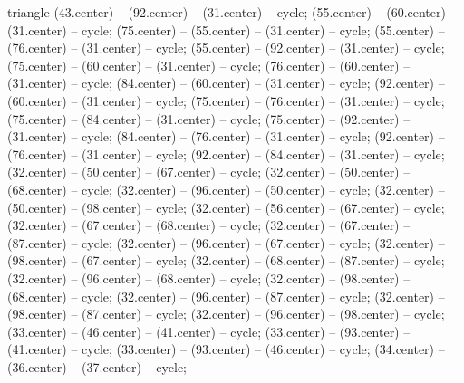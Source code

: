 \begin{pgfonlayer}{triangle}
 (43.center) -- (92.center) -- (31.center) -- cycle; 
 (55.center) -- (60.center) -- (31.center) -- cycle; 
 (75.center) -- (55.center) -- (31.center) -- cycle; 
 (55.center) -- (76.center) -- (31.center) -- cycle; 
 (55.center) -- (92.center) -- (31.center) -- cycle; 
 (75.center) -- (60.center) -- (31.center) -- cycle; 
 (76.center) -- (60.center) -- (31.center) -- cycle; 
 (84.center) -- (60.center) -- (31.center) -- cycle; 
 (92.center) -- (60.center) -- (31.center) -- cycle; 
 (75.center) -- (76.center) -- (31.center) -- cycle; 
 (75.center) -- (84.center) -- (31.center) -- cycle; 
 (75.center) -- (92.center) -- (31.center) -- cycle; 
 (84.center) -- (76.center) -- (31.center) -- cycle; 
 (92.center) -- (76.center) -- (31.center) -- cycle; 
 (92.center) -- (84.center) -- (31.center) -- cycle; 
 (32.center) -- (50.center) -- (67.center) -- cycle; 
 (32.center) -- (50.center) -- (68.center) -- cycle; 
 (32.center) -- (96.center) -- (50.center) -- cycle; 
 (32.center) -- (50.center) -- (98.center) -- cycle; 
 (32.center) -- (56.center) -- (67.center) -- cycle; 
 (32.center) -- (67.center) -- (68.center) -- cycle; 
 (32.center) -- (67.center) -- (87.center) -- cycle; 
 (32.center) -- (96.center) -- (67.center) -- cycle; 
 (32.center) -- (98.center) -- (67.center) -- cycle; 
 (32.center) -- (68.center) -- (87.center) -- cycle; 
 (32.center) -- (96.center) -- (68.center) -- cycle; 
 (32.center) -- (98.center) -- (68.center) -- cycle; 
 (32.center) -- (96.center) -- (87.center) -- cycle; 
 (32.center) -- (98.center) -- (87.center) -- cycle; 
 (32.center) -- (96.center) -- (98.center) -- cycle; 
 (33.center) -- (46.center) -- (41.center) -- cycle; 
 (33.center) -- (93.center) -- (41.center) -- cycle; 
 (33.center) -- (93.center) -- (46.center) -- cycle; 
 (34.center) -- (36.center) -- (37.center) -- cycle; 

\end{pgfonlayer}
